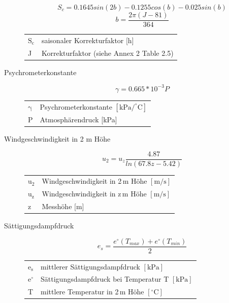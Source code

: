 \begin{appendix}
\begin{description}
\begin{equation}
\label{eq:s_c}
S_c=0.1645sin(2b)-0.1255cos(b)-0.025sin(b)
\end{equation}
\begin{equation}
b=\frac{2\pi(J-81)}{364}
\end{equation}
\begin{table}[H]
\centering
\begin{tabular}{ll}
$\mathrm{S_c}$ & saisonaler Korrekturfaktor [h]\\
J & Korrekturfaktor (siehe \cite{fao} Annex 2 Table 2.5)\\
\end{tabular}
\end{table}

\item[Psychrometerkonstante]
\begin{equation}
\label{eq:gamma}
\gamma=0.665*10^{-3} P
\end{equation}
\begin{table}[H]
\centering
\begin{tabular}{ll}
$\mathrm{\gamma}$ & Psychrometerkonstante $\mathrm{[kPa/^{\circ}C]}$\\
P & Atmosphärendruck [kPa]\\
\end{tabular}
\end{table}

\item[Windgeschwindigkeit in 2 m Höhe]
\begin{equation}
\label{eq:u2}
u_2=u_z\frac{4.87}{ln(67.8z-5.42)}
\end{equation}
\begin{table}[H]
\centering
\begin{tabular}{ll}
$\mathrm{u_2}$ & Windgeschwindigkeit in 2\,m Höhe $\mathrm{[m/s]}$\\
$\mathrm{u_z}$ & Windgeschwindigkeit in z\,m Höhe $\mathrm{[m/s]}$\\
z & Messhöhe [m]\\
\end{tabular}
\end{table}



\item[Sättigungsdampfdruck]
\begin{equation}
\label{eq:es}
e_s=\frac{e^{\circ}(T_{max})+e^{\circ}(T_{min})}{2}
\end{equation}
\begin{table}[H]
\centering
\begin{tabular}{ll}
$\mathrm{e_s}$ & mittlerer Sättigungsdampfdruck $\mathrm{[kPa]}$\\
$\mathrm{e^{\circ}}$ & Sättigungsdampfdruck bei Temperatur T $\mathrm{[kPa]}$\\
T & mittlere Temperatur in 2\,m Höhe $\mathrm{[^{\circ}C]}$\\
\end{tabular}
\end{table}


\end{description}
\end{appendix}
